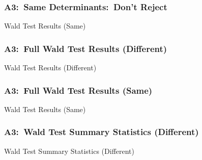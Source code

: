 \documentclass[12pt, aspectratio=169]{beamer}
\begin{document}
\begin{frame}[label=wtrs]
\frametitle{A3:\ Same Determinants:\ Don't Reject}
\addtocounter{framenumber}{-1}
\begin{table}[htbp]
  \centering
  \addtocounter{table}{-1}
  \renewcommand{\thetable}{\arabic{table}b}
  \caption{Wald Test Results (Same)}
  \vspace{5pt}
  \begin{adjustbox}{totalheight=.7\textheight}

  \end{adjustbox}
\end{table}%
\hyperlink{avsa}{}
\end{frame}

\begin{frame}[label=fwtrd]
\frametitle{A3:\ Full Wald Test Results (Different)}
\begin{table}[htbp]
  \centering
  \renewcommand{\thetable}{\arabic{table}a}
  \caption{Wald Test Results (Different)}
  \vspace{5pt}
  \begin{adjustbox}{totalheight=.7\textheight}

  \end{adjustbox}
\end{table}%
\hyperlink{avsa}{}
\end{frame}

\begin{frame}[label=fwtrs]
\frametitle{A3:\ Full Wald Test Results (Same)}
\addtocounter{framenumber}{-1}
\begin{table}[htbp]
  \centering
  \addtocounter{table}{-1}
  \renewcommand{\thetable}{\arabic{table}b}
  \caption{Wald Test Results (Same)}
  \vspace{5pt}
  \begin{adjustbox}{totalheight=.7\textheight}

  \end{adjustbox}
\end{table}%
\hyperlink{avsa}{}
\end{frame}

\begin{frame}[label=wtssd]
\frametitle{A3:\ Wald Test Summary Statistics (Different)}
\begin{table}[htbp]
  \centering
  \renewcommand{\thetable}{\arabic{table}a}
  \caption{Wald Test Summary Statistics (Different)}
  \vspace{5pt}
  \begin{adjustbox}{totalheight=.7\textheight}

  \end{adjustbox}
\end{table}%
\hyperlink{avsa}{}
\end{frame}
\end{document}
